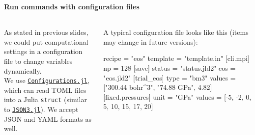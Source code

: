 \begin{frame}[fragile]
    \frametitle{\subsecname}
    \framesubtitle{Run commands with configuration files}

    \begin{columns}[t]
        \begin{column}[T, onlytextwidth]{0.4\textwidth}
            As stated in previous slides, we could put computational settings
            in a configuration file to change variables dynamically.\\

            We use
            \href{https://github.com/Roger-luo/Configurations.jl}{\texttt{Configurations.jl}},
            which can read TOML files into a Julia \texttt{struct}
            (similar to \href{https://github.com/quinnj/JSON3.jl}{\texttt{JSON3.jl}}).
            We accept JSON and YAML formats as well.
        \end{column}

        \begin{column}[T]{0.6\textwidth}
            {\footnotesize A typical configuration file looks like this (items may change in future versions):}
            {\scriptsize
                \begin{algorithmblock}
                    \begin{juliaverbatim}
recipe = "eos"
template = "template.in"
[cli.mpi]
np = 128
[save]
status = "status.jld2"
eos = "eos.jld2"
[trial_eos]
type = "bm3"
values = ["300.44 bohr^3", "74.88 GPa", 4.82]
[fixed.pressures]
unit = "GPa"
values = [-5, -2, 0, 5, 10, 15, 17, 20]
    \end{juliaverbatim}
                \end{algorithmblock}
            }
        \end{column}
    \end{columns}

\end{frame}
